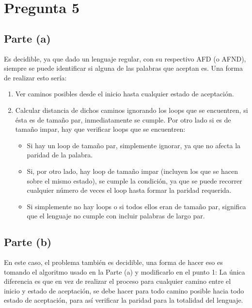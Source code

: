 \documentclass[11pt,letterpaper]{article}
\begin{document}
\section{Pregunta 5}
\subsection{Parte (a)}
Es decidible, ya que dado un lenguaje regular, con su respectivo AFD (o AFND), siempre se puede identificar si alguna de las palabras que aceptan es. Una forma de realizar esto sería:

\begin{enumerate}
	\item Ver caminos posibles desde el inicio hasta cualquier estado de aceptación.
	\item Calcular distancia de dichos caminos ignorando los loops que se encuentren, si ésta es de tamaño par, inmediatamente se cumple. Por otro lado si es de tamaño impar, hay que verificar loops que se encuentren:
	\begin{itemize}
		\item Si hay un loop de tamaño par, simplemente ignorar, ya que no afecta la paridad de la palabra.
		\item Si, por otro lado, hay loop de tamaño impar (incluyen los que se hacen sobre el mismo estado), se cumple la condición, ya que se puede recorrer cualquier número de veces el loop hasta formar la paridad requerida.
		\item Si simplemente no hay loops o si todos ellos eran de tamaño par, significa que el lenguaje no cumple con incluir palabras de largo par.
	\end{itemize}
\end{enumerate}

\subsection{Parte (b)}
En este caso, el problema también es decidible, una forma de hacer eso es tomando el algoritmo usado en la Parte (a) y modificarlo en el punto 1:
La única diferencia es que en vez de realizar el proceso para cualquier camino entre el inicio y estado de aceptación, se debe hacer para todo camino posible hacia todo estado de aceptación, para así verificar la paridad para la totalidad del lenguaje.
\end{document}
